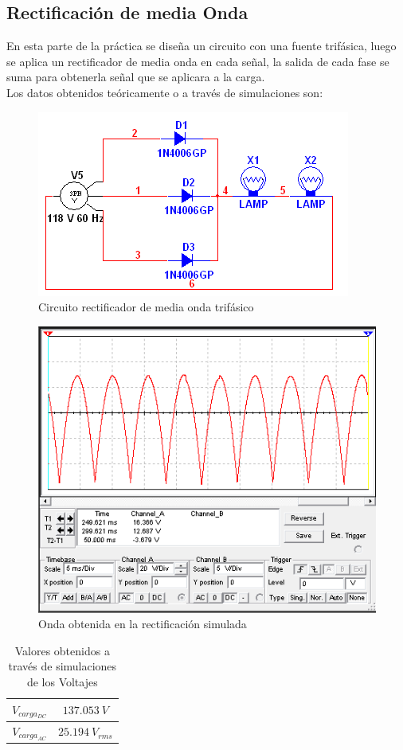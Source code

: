 \documentclass[twocolumn]{IEEEtran}
\begin{document}
\subsection{Rectificación de media Onda}
\noindent
En esta parte de la práctica se diseña un circuito con una fuente trifásica, luego se aplica un rectificador de media onda en cada señal, la salida de cada fase se suma para obtenerla señal que se aplicara a la carga.\\
Los datos obtenidos teóricamente o a través de simulaciones son:
\begin{figure}[H]
	\centering
		\includegraphics[scale=0.7]{circ3.PNG}
	\caption{Circuito rectificador de media onda trifásico}
	\label{circ14}
\end{figure}
\begin{figure}[H]
	\centering
		\includegraphics[scale=0.5]{onda.PNG}
	\caption{Onda obtenida en la rectificación simulada}
	\label{fig15}
\end{figure}
\begin{table}[H]
	\centering
\begin{tabular}[c]{|c|c|} \hline
$V_{carga_{DC}}$ & $137.053\ V$ \\ \hline
$V_{carga_{AC}}$ & $25.194\ V_{rms}$ \\ \hline
\end{tabular}
	\caption{Valores obtenidos a través de simulaciones de los Voltajes}
	\label{tab81}
\end{table}
\end{document}
